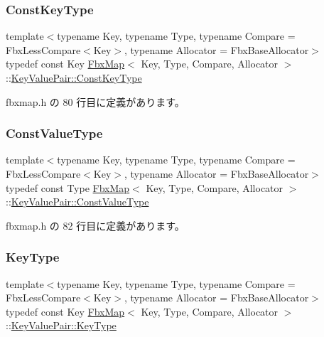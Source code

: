 \subsubsection{\texorpdfstring{Const\+Key\+Type}{ConstKeyType}}
{\footnotesize\ttfamily template$<$typename Key, typename Type, typename Compare = Fbx\+Less\+Compare$<$\+Key$>$, typename Allocator = Fbx\+Base\+Allocator$>$ \\
typedef const Key \hyperlink{class_fbx_map}{Fbx\+Map}$<$ Key, Type, Compare, Allocator $>$\+::\hyperlink{class_fbx_map_1_1_key_value_pair_a74738485dc0b74e76e09dfbcdca9e62e}{Key\+Value\+Pair\+::\+Const\+Key\+Type}}



 fbxmap.\+h の 80 行目に定義があります。

\mbox{\label{class_fbx_map_1_1_key_value_pair_a13d0030dcec9979f30273cc4ac6ed871}} 
\subsubsection{\texorpdfstring{Const\+Value\+Type}{ConstValueType}}
{\footnotesize\ttfamily template$<$typename Key, typename Type, typename Compare = Fbx\+Less\+Compare$<$\+Key$>$, typename Allocator = Fbx\+Base\+Allocator$>$ \\
typedef const Type \hyperlink{class_fbx_map}{Fbx\+Map}$<$ Key, Type, Compare, Allocator $>$\+::\hyperlink{class_fbx_map_1_1_key_value_pair_a13d0030dcec9979f30273cc4ac6ed871}{Key\+Value\+Pair\+::\+Const\+Value\+Type}}



 fbxmap.\+h の 82 行目に定義があります。

\mbox{\label{class_fbx_map_1_1_key_value_pair_a5e685c6ff77cdf31f878e5105737c1a3}} 
\subsubsection{\texorpdfstring{Key\+Type}{KeyType}}
{\footnotesize\ttfamily template$<$typename Key, typename Type, typename Compare = Fbx\+Less\+Compare$<$\+Key$>$, typename Allocator = Fbx\+Base\+Allocator$>$ \\
typedef const Key \hyperlink{class_fbx_map}{Fbx\+Map}$<$ Key, Type, Compare, Allocator $>$\+::\hyperlink{class_fbx_map_1_1_key_value_pair_a5e685c6ff77cdf31f878e5105737c1a3}{Key\+Value\+Pair\+::\+Key\+Type}}



